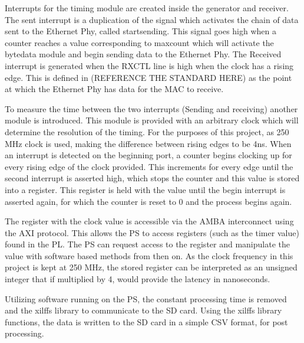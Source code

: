 Interrupts for the timing module are created inside the generator and receiver. The sent interrupt is a duplication 
of the signal which activates the chain of data sent to the Ethernet Phy, called start\textunderscore sending. This 
signal goes high when a counter reaches a value corresponding to max\textunderscore count which will activate the 
byte\textunderscore data module and begin sending data to the Ethernet Phy. The Received interrupt is generated when 
the RX\textunderscore CTL line is high when the clock has a rising edge. This is defined in (REFERENCE THE STANDARD 
HERE) as the point at which the Ethernet Phy has data for the MAC to receive. 

To measure the time between the two interrupts (Sending and receiving) another module is introduced. This module is 
provided with an arbitrary clock which will determine the resolution of the timing. For the purposes of this project,
as 250 MHz clock is used, making the difference between rising edges to be 4ns. When an interrupt is detected on 
the beginning port, a counter begins clocking up for every rising edge of the clock provided. This increments for 
every edge until the second interrupt is asserted high, which stops the counter and this value is stored into a 
register. This register is held with the value until the begin interrupt is asserted again, for which the counter is 
reset to 0 and the process begins again.

The register with the clock value is accessible via the AMBA interconnect using the AXI protocol. This allows the PS 
to access registers (such as the timer value) found in the PL. The PS can request access to the register and 
manipulate the value with software based methods from then on. As the clock frequency in this project is kept at 250 
MHz, the stored register can be interpreted as an unsigned integer that if multiplied by 4, would provide the latency 
in nanoseconds. 

Utilizing software running on the PS, the constant processing time is removed and the xilffs library to communicate 
to the SD card. Using the xilffs library functions, the data is written to the SD card in a simple CSV format, for 
post processing.

%

%

%
